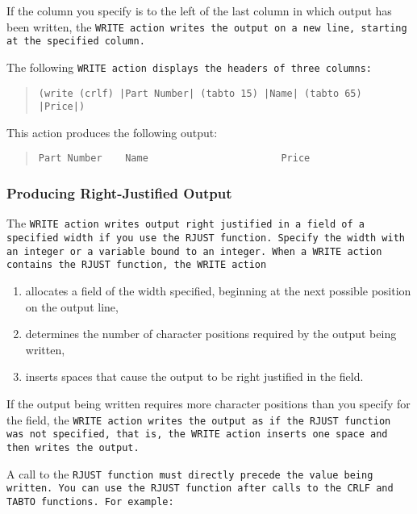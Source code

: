 If the column you specify is to the left of
the last column in which output has been
written, the \tt{WRITE} action writes the output on
a new line, starting at the specified column.

The following \tt{WRITE} action displays the headers of three columns:

\begin{quote}
\begin{verbatim}
(write (crlf) |Part Number| (tabto 15) |Name| (tabto 65) |Price|)
\end{verbatim}
\end{quote}

This action produces the following output:

\begin{quote}
\begin{verbatim}
Part Number    Name                       Price
\end{verbatim}
\end{quote}

\subsubsection{Producing Right-Justified Output}

The \tt{WRITE} action writes output right justified in a field of a
specified width if you use the \tt{RJUST} function. Specify the width
with an integer or a variable bound to an integer.  When a \tt{WRITE}
action contains the \tt{RJUST} function, the \tt{WRITE} action

\begin{enumerate}
\item allocates a field of the width specified, beginning at the next
  possible position on the output line,
\item determines the number of character positions required by the
  output being written,
\item inserts spaces that cause the output to be right justified in
  the field.
\end{enumerate}

If the output being written requires more character positions than you
specify for the field, the \tt{WRITE} action writes the output as if
the \tt{RJUST} function was not specified, that is, the \tt{WRITE}
action inserts one space and then writes the output.

A call to the \tt{RJUST} function must directly precede the value
being written. You can use the \tt{RJUST} function after calls to the
\tt{CRLF} and \tt{TABTO} functions. For example:

